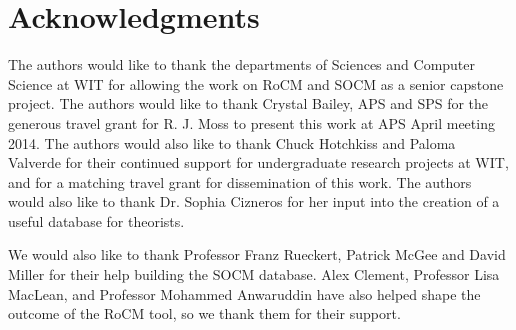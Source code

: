 \documentclass[conference]{IEEEtran-modified}
\begin{document}
\section*{Acknowledgments}
The authors would like to thank the departments of Sciences and Computer Science at WIT for allowing the work on RoCM and SOCM as a senior capstone project. The authors would like to thank Crystal Bailey, APS and SPS for the generous travel grant for R. J. Moss to present this work at APS April meeting 2014. The authors would also like to thank Chuck Hotchkiss and Paloma Valverde for their continued support for undergraduate research projects at WIT, and for a matching travel grant for dissemination of this work. The authors would also like to thank Dr. Sophia Cizneros for her input into the creation of a useful database for theorists.

We would also like to thank Professor Franz Rueckert, Patrick McGee and David Miller for their help building the SOCM database. Alex Clement, Professor Lisa MacLean, and Professor Mohammed Anwaruddin have also helped shape the outcome of the RoCM tool, so we thank them for their support.






\hspace{\textwidth}
\end{document}
